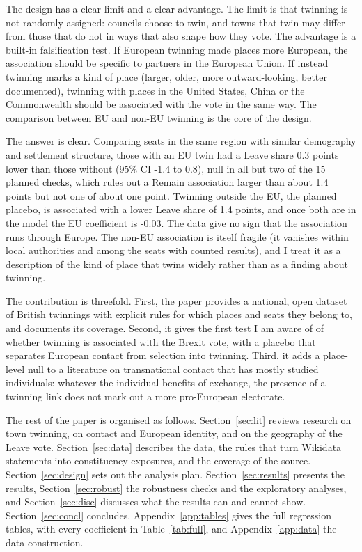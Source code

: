 \documentclass[11pt,a4paper]{article}
\begin{document}
The design has a clear limit and a clear advantage. The limit is that twinning is not randomly assigned: councils choose to twin, and towns that twin may differ from those that do not in ways that also shape how they vote. The advantage is a built-in falsification test. If European twinning made places more European, the association should be specific to partners in the European Union. If instead twinning marks a kind of place (larger, older, more outward-looking, better documented), twinning with places in the United States, China or the Commonwealth should be associated with the vote in the same way. The comparison between EU and non-EU twinning is the core of the design.

The answer is clear. Comparing seats in the same region with similar demography and settlement structure, those with an EU twin had a Leave share 0.3 points lower than those without (95\% CI -1.4 to 0.8), null in all but two of the 15 planned checks, which rules out a Remain association larger than about 1.4 points but not one of about one point. Twinning outside the EU, the planned placebo, is associated with a lower Leave share of 1.4 points, and once both are in the model the EU coefficient is -0.03. The data give no sign that the association runs through Europe. The non-EU association is itself fragile (it vanishes within local authorities and among the seats with counted results), and I treat it as a description of the kind of place that twins widely rather than as a finding about twinning.

The contribution is threefold. First, the paper provides a national, open dataset of British twinnings with explicit rules for which places and seats they belong to, and documents its coverage. Second, it gives the first test I am aware of of whether twinning is associated with the Brexit vote, with a placebo that separates European contact from selection into twinning. Third, it adds a place-level null to a literature on transnational contact that has mostly studied individuals: whatever the individual benefits of exchange, the presence of a twinning link does not mark out a more pro-European electorate.

The rest of the paper is organised as follows. Section~\ref{sec:lit} reviews research on town twinning, on contact and European identity, and on the geography of the Leave vote. Section~\ref{sec:data} describes the data, the rules that turn Wikidata statements into constituency exposures, and the coverage of the source. Section~\ref{sec:design} sets out the analysis plan. Section~\ref{sec:results} presents the results, Section~\ref{sec:robust} the robustness checks and the exploratory analyses, and Section~\ref{sec:disc} discusses what the results can and cannot show. Section~\ref{sec:concl} concludes. Appendix~\ref{app:tables} gives the full regression tables, with every coefficient in Table~\ref{tab:full}, and Appendix~\ref{app:data} the data construction.
\end{document}
